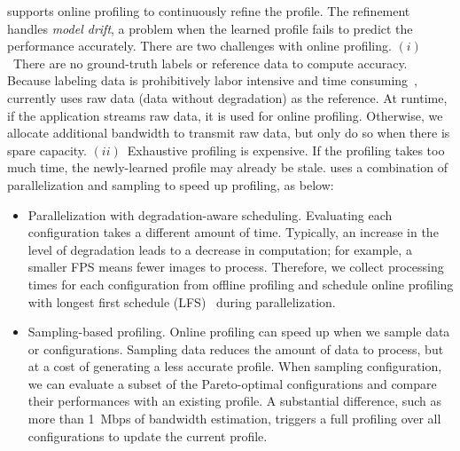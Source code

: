 
 \sysname{} supports online profiling to continuously
refine the profile. The refinement handles \textit{model drift}, a problem when
the learned profile fails to predict the performance accurately. There are two
challenges with online profiling.  $(i)$~There are no ground-truth labels or
reference data to compute accuracy. Because labeling data is prohibitively labor
intensive and time consuming~\cite{russell2008labelme}, \sysname{} currently
uses raw data (data without degradation) as the reference. At runtime, if the
application streams raw data, it is used for online profiling. Otherwise, we
allocate additional bandwidth to transmit raw data, but only do so when there is
spare capacity. $(ii)$~Exhaustive profiling is expensive. If the profiling takes
too much time, the newly-learned profile may already be stale. \sysname{} uses a
combination of parallelization and sampling to speed up profiling, as below:

\begin{itemize}[leftmargin=*, topsep=3pt]

\item Parallelization with degradation-aware scheduling. Evaluating each
  configuration takes a different amount of time. Typically, an increase in the
  level of degradation leads to a decrease in computation; for example, a
  smaller FPS means fewer images to process. Therefore, we collect processing
  times for each configuration from offline profiling and schedule online
  profiling with longest first schedule (LFS)~\cite{karger2010scheduling} during
  parallelization.

\item Sampling-based profiling. Online profiling can speed up when we sample
  data or configurations. Sampling data reduces the amount of data to process,
  but at a cost of generating a less accurate profile. When sampling
  configuration, we can evaluate a subset of the Pareto-optimal configurations
  and compare their performances with an existing profile. A substantial
  difference, such as more than \SI{1}{Mbps} of bandwidth estimation, triggers a
  full profiling over all configurations to update the current profile.

\end{itemize}


